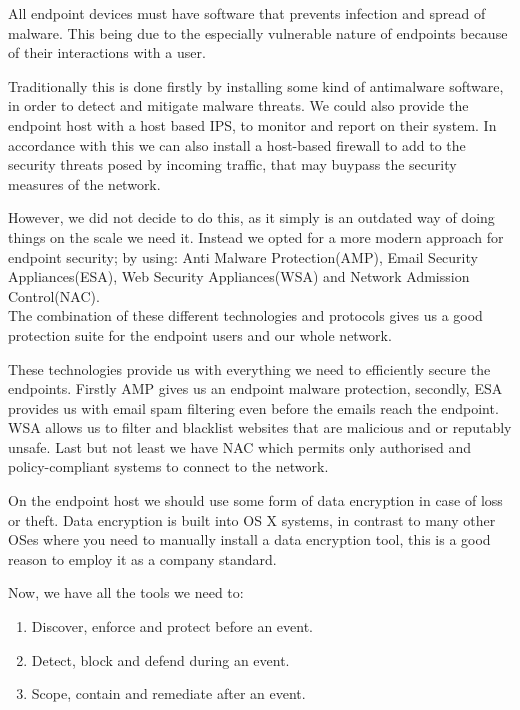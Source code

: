 All endpoint devices must have software that prevents infection and spread of malware. This being due to the especially vulnerable nature of endpoints because of their interactions with a user.

Traditionally this is done firstly by installing some kind of antimalware software, in order to detect and mitigate malware threats. We could also provide the endpoint host with a host based IPS, to monitor and report on their system.
In accordance with this we can also install a host-based firewall to add to the security threats posed by incoming traffic, that may buypass the security measures of the network.

However, we did not decide to do this, as it simply is an outdated way of doing things on the scale we need it. Instead we opted for a more modern approach for endpoint security; by using:
Anti Malware Protection(AMP),
Email Security Appliances(ESA),
Web Security Appliances(WSA) 
and Network Admission Control(NAC).
\\The combination of these different technologies and protocols gives us a good protection suite for the endpoint users and our whole network.

These technologies provide us with everything we need to efficiently secure the endpoints. Firstly AMP gives us an endpoint malware protection, secondly, ESA provides us with email spam filtering even before the emails reach the endpoint.
\\ WSA allows us to filter and blacklist websites that are malicious and or reputably unsafe. Last but not least we have NAC which permits only authorised and policy-compliant systems to connect to the network.

On the endpoint host we should use some form of data encryption in case of loss or theft. Data encryption is built into OS X systems, in contrast to many other OSes where you need to manually install a data encryption tool, this is a good reason to employ it as a company standard.

Now, we have all the tools we need to:
\begin{enumerate}
    \item Discover, enforce and protect before an event.
    \item Detect, block and defend during an event.
    \item Scope, contain and remediate after an event.
\end{enumerate}



